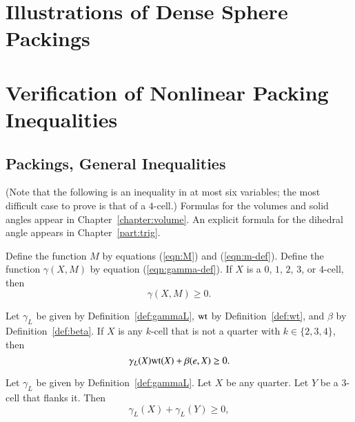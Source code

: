 \chapter{Illustrations of Dense Sphere Packings}

\chapter{Verification of Nonlinear Packing Inequalities}


\section{Packings, General Inequalities}


(Note that the following is an inequality in at most six variables; the most
difficult case to prove is that of a $4$-cell.)  Formulas for the
volumes and solid angles appear in Chapter~\ref{chapter:volume}.  An
explicit formula for the dihedral angle appears in
Chapter~\ref{part:trig}.


\begin{calculation}\label{calc:marchal}\cutrate{}
% 
Define the function $M$ by equations (\ref{eqn:M}) and
(\ref{eqn:m-def}).  Define the function $\gamma(X,M)$ by equation
(\ref{eqn:gamma-def}).  If $X$ is a $0$, $1$, $2$, $3$, or $4$-cell,
then
\[ 
\gamma(X,M)\ge 0.
\] 
\end{calculation}

\begin{calculation}\label{calc:cc:qtr}\cutrate{}
Let $\gamma_L$ be given by Definition~\ref{def:gammaL}, ${\operatorname{wt}}$ by
Definition~\ref{def:wt}, and $\beta$ by Definition~\ref{def:beta}.
If $X$ is any $k$-cell that is not a quarter with $k\in\{2,3,4\}$,
then %
\[ 
\gamma_L(X) {\operatorname{wt}}(X) + \beta(e,X)\ge 0.
\]  
\end{calculation}

\begin{calculation}\label{calc:cc:2bl}\cutrate{}
Let $\gamma_L$ be given by Definition~\ref{def:gammaL}.  Let $X$ be
any quarter.  Let $Y$ be a $3$-cell that flanks it.  Then
\[ 
\gamma_L(X)+\gamma_L(Y)\ge 0,
\] 
\end{calculation}


